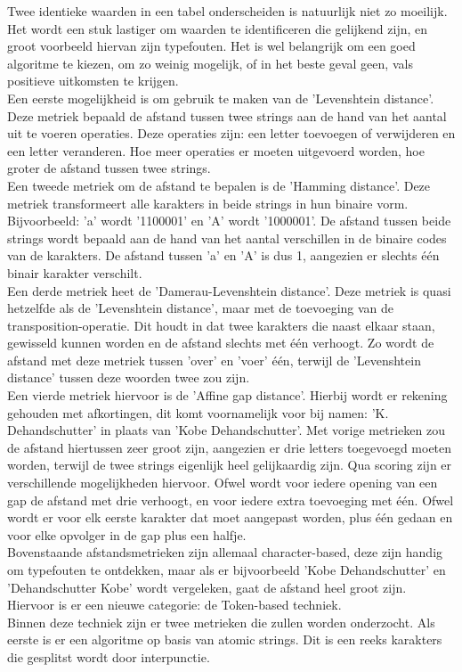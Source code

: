 Twee identieke waarden in een tabel onderscheiden is natuurlijk niet zo moeilijk. Het wordt een stuk lastiger om waarden te identificeren die gelijkend zijn, en groot voorbeeld hiervan zijn typefouten. Het is wel belangrijk om een goed algoritme te kiezen, om zo weinig mogelijk, of in het beste geval geen, vals positieve uitkomsten te krijgen.
\\\indent
Een eerste mogelijkheid is om gebruik te maken van de 'Levenshtein distance'. Deze metriek bepaald de afstand tussen twee strings aan de hand van het aantal uit te voeren operaties. Deze operaties zijn: een letter toevoegen of verwijderen en een letter veranderen. Hoe meer operaties er moeten uitgevoerd worden, hoe groter de afstand tussen twee strings.
\\\indent
Een tweede metriek om de afstand te bepalen is de 'Hamming distance'. Deze metriek transformeert alle karakters in beide strings in hun binaire vorm. Bijvoorbeeld: 'a' wordt '1100001' en 'A' wordt '1000001'. De afstand tussen beide strings wordt bepaald aan de hand van het aantal verschillen in de binaire codes van de karakters. De afstand tussen 'a' en 'A' is dus 1, aangezien er slechts één binair karakter verschilt.
\\\indent
Een derde metriek heet de 'Damerau-Levenshtein distance'. Deze metriek is quasi hetzelfde als de 'Levenshtein distance', maar met de toevoeging van de transposition-operatie. Dit houdt in dat twee karakters die naast elkaar staan, gewisseld kunnen worden en de afstand slechts met één verhoogt. Zo wordt de afstand met deze metriek tussen 'over' en 'voer' één, terwijl de 'Levenshtein distance' tussen deze woorden twee zou zijn.
\\\indent
Een vierde metriek hiervoor is de 'Affine gap distance'. Hierbij wordt er rekening gehouden met afkortingen, dit komt voornamelijk voor bij namen: 'K. Dehandschutter' in plaats van 'Kobe Dehandschutter'. Met vorige metrieken zou de afstand hiertussen zeer groot zijn, aangezien er drie letters toegevoegd moeten worden, terwijl de twee strings eigenlijk heel gelijkaardig zijn. Qua scoring zijn er verschillende mogelijkheden hiervoor. Ofwel wordt voor iedere opening van een gap de afstand met drie verhoogt, en voor iedere extra toevoeging met één. Ofwel wordt er voor elk eerste karakter dat moet aangepast worden, plus één gedaan en voor elke opvolger in de gap plus een halfje.
\\\indent
Bovenstaande afstandsmetrieken zijn allemaal character-based, deze zijn handig om typefouten te ontdekken, maar als er bijvoorbeeld 'Kobe Dehandschutter' en 'Dehandschutter Kobe' wordt vergeleken, gaat de afstand heel groot zijn. Hiervoor is er een nieuwe categorie: de Token-based techniek.
\\\indent
Binnen deze techniek zijn er twee metrieken die zullen worden onderzocht. Als eerste is er een algoritme op basis van atomic strings. Dit is een reeks karakters die gesplitst wordt door interpunctie.
\\\indent




